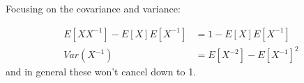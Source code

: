 \documentclass{exam}
\begin{document}
\begin{questions}
\begin{solution}
    Focusing on the covariance and variance:

    \begin{align*}
        E[XX^{-1}] - E[X]E[X^{-1}] &= 1 - E[X]E[X^{-1}] \\
        Var(X^{-1}) &= E[X^{-2}] - E[X^{-1}]^2
    \end{align*}
    and in general these won't cancel down to 1.
\end{solution}

\end{questions}
\end{document}
